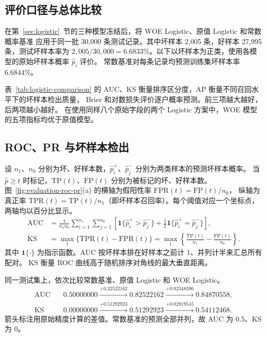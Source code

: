 \subsection{评价口径与总体比较}
在第~\ref{sec:logistic}~节的三种模型冻结后，将 WOE Logistic、原值 Logistic 和常数概率基准
应用于同一批 30,000 条测试记录。其中坏样本 2,005 条，好样本 27,995 条，测试坏样本率为
$2{,}005/30{,}000=6.6833\%$。以下以坏样本为正类，使用各模型的原始坏样本概率 $\widehat p_i$ 评价。
常数基准对每条记录均预测训练集坏样本率 $6.6844\%$。

\begin{table}[!htbp]
  \centering
  \caption{三模型在同一测试集上的表现}
  \label{tab:logistic-comparison}
  \small
  \setlength{\tabcolsep}{8pt}
  
\end{table}

表~\ref{tab:logistic-comparison} 的 AUC、KS 衡量排序区分度，AP 衡量不同召回水平下的坏样本检出质量，
Brier 和对数损失评价逐户概率预测。前三项越大越好，后两项越小越好。
在使用同样八个原始字段的两个 Logistic 方案中，WOE 模型的五项指标均优于原值模型。

\subsection{ROC、PR 与坏样本检出}
设 $n_1$、$n_0$ 分别为坏、好样本数，$\widehat p_i^+$、$\widehat p_j^-$ 分别为两类样本的预测坏样本概率。
当 $\widehat p\geq t$ 时标记，$\mathrm{TP}(t)$、$\mathrm{FP}(t)$ 分别为被标记的坏、好样本数。
图~\ref{fig:evaluation-roc-pr}(a) 的横轴为假阳性率 $\mathrm{FPR}(t)=\mathrm{FP}(t)/n_0$，
纵轴为真正率 $\mathrm{TPR}(t)=\mathrm{TP}(t)/n_1$（即坏样本召回率）。每个阈值对应一个坐标点，两轴均以百分比显示。
\[
  \begin{aligned}
    \mathrm{AUC}
    &= \frac{1}{n_1n_0}\sum_{i=1}^{n_1}\sum_{j=1}^{n_0}
       \left[\mathbf{1}\{\widehat p_i^+>\widehat p_j^-\}
       +\frac{1}{2}\mathbf{1}\{\widehat p_i^+=\widehat p_j^-\}\right], \\
    \mathrm{KS}
    &= \max_t\{\mathrm{TPR}(t)-\mathrm{FPR}(t)\}
     = \max_t\left\{\frac{\mathrm{TP}(t)}{n_1}-\frac{\mathrm{FP}(t)}{n_0}\right\}.
  \end{aligned}
\]
其中 $\mathbf{1}\{\cdot\}$ 为指示函数。AUC 按坏样本排在好样本之前计 1、并列计半来汇总所有配对。
KS 衡量 ROC 曲线高于随机排序对角线的最大垂直距离。

同一测试集上，依次比较常数基准、原值 Logistic 和 WOE Logistic。
\[
  \begin{aligned}
    \mathrm{AUC}&\quad 0.50000000\xrightarrow{+0.32522162}0.82522162\xrightarrow{+0.02348396}0.84870558, \\
    \mathrm{KS} &\quad 0.00000000\xrightarrow{+0.51292923}0.51292923\xrightarrow{+0.02819545}0.54112468.
  \end{aligned}
\]
箭头标注用原始精度计算的差值。常数基准的预测全部并列，故 AUC 为 $0.5$、KS 为 $0$。

